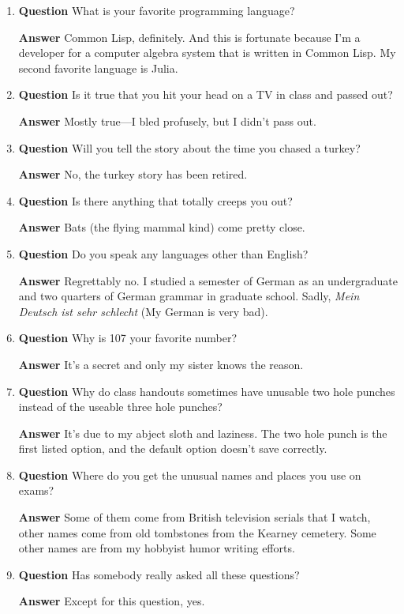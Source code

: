 \documentclass[11pt]{article}
\newcounter{ex}\setcounter{ex}{0}
\newcounter{dy}\setcounter{dy}{0}
\begin{document}
\begin{enumerate}
\item   \textbf{Question}  What is your favorite programming language?

 \textbf{Answer}  Common Lisp, definitely. And this is fortunate because I'm a developer for a computer algebra system that is written in Common Lisp. My second favorite language is Julia.

\item   \textbf{Question} Is it true that you hit your head on a TV in class and 
passed out?

  \textbf{Answer} Mostly true---I bled profusely, but I didn't pass out.

\item   \textbf{Question} Will you tell the story about the time you chased a turkey?

 \textbf{Answer} No, the turkey story has been retired.


\item   \textbf{Question} Is there anything that totally creeps you out?

\textbf{Answer} Bats (the flying mammal kind) come pretty close.

\item \textbf{Question} Do you speak any languages other than English?

\textbf{Answer} Regrettably no. I studied a semester of German as an 
undergraduate and two quarters of German grammar in graduate school. 
Sadly, \emph{Mein Deutsch ist sehr schlecht} (My German is very bad).

\item \textbf{Question} Why is 107 your favorite number?

 \textbf{Answer} It's a secret and only my sister knows the reason.

\item \textbf{Question} Why do class handouts sometimes have unusable 
two hole punches instead of the useable three hole punches?

\textbf{Answer} It's due to my abject sloth and laziness.  The two hole
punch is the first listed option, and the default option doesn't save
correctly.

\item \textbf{Question} Where do you get the unusual names and places you
use on exams?
 
\textbf{Answer} Some of them come from British television serials
that I watch, other names come from old tombstones from the Kearney cemetery.
Some other names are from my hobbyist humor writing efforts.

\item  \textbf{Question} Has somebody really asked all these questions?
 
\textbf{Answer}  Except for  this question, yes.
\end{enumerate}
\end{document}
